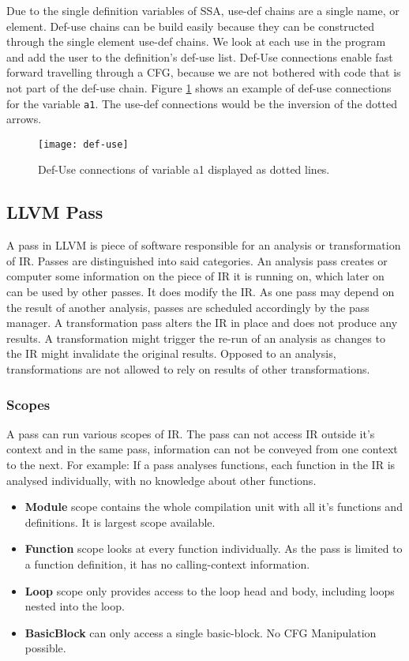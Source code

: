 Due to the single definition variables of SSA, use-def chains are a single name, or element. Def-use chains can be build easily because they can be constructed through the single element use-def chains. We look at each use in the program and add the user to the definition's def-use list. Def-Use connections enable fast forward travelling through a CFG, because we are not bothered with code that is not part of the def-use chain. Figure \ref{def-use} shows an example of def-use connections for the variable \verb|a1|. The use-def connections would be the inversion of the dotted arrows. \cite{Rastello:2016:SCD:3002539}
\begin{figure}[t]
	\centering
	\texttt{[image: def-use]}
	\caption{Def-Use connections of variable a1 displayed as dotted lines.}
	\label{def-use}
\end{figure}

\subsection{LLVM Pass}\label{llvmpass}
A pass in LLVM is piece of software responsible for an analysis or transformation of IR. Passes are distinguished into said categories. An analysis pass creates or computer some information on the piece of IR it is running on, which later on can be used by other passes. It does modify the IR. As one pass may depend on the result of another analysis, passes are scheduled accordingly by the pass manager. A transformation pass alters the IR in place and does not produce any results. A transformation might trigger the re-run of an analysis as changes to the IR might invalidate the original results. Opposed to an analysis, transformations are not allowed to rely on results of other transformations. \cite{llvm-passes}
\subsubsection{Scopes}
A pass can run various scopes of IR. The pass can not access IR outside it's context and in the same pass, information can not be conveyed from one context to the next. For example: If a pass analyses functions, each function in the IR is analysed individually, with no knowledge about other functions. \cite{llvm-scopes}
\begin{itemize}
	\item \textbf{Module} scope contains the whole compilation unit with all it's functions and definitions. It is largest scope available.
	\item \textbf{Function} scope looks at every function individually. As the pass is limited to a function definition, it has no calling-context information. 
	\item \textbf{Loop} scope only provides access to the loop head and body, including loops nested into the loop.
	\item \textbf{BasicBlock} can only access a single basic-block. No CFG Manipulation possible.
\end{itemize}

